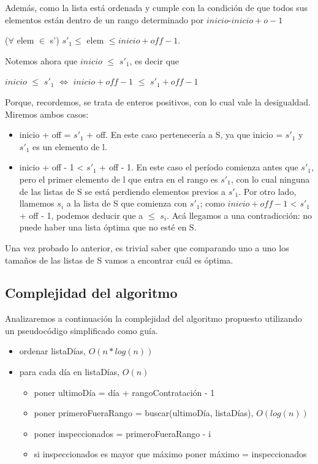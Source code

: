 Adem\'as, como la lista est\'a ordenada y cumple con la condici\'on de que todos sus elementos est\'an dentro de un rango determinado por $inicio$-$inicio + o - 1$\\
\begin{center}
($\forall$ elem $\in$ s') $s'_1 \leq$ elem $\leq inicio + off - 1$.\\
\end{center}

Notemos ahora que $inicio$ $\leq$ $s'_1$, es decir que \\ 
\begin{center}
$inicio$ $\leq$ $s'_1$ $\Leftrightarrow$ $inicio + off - 1$ $\leq$ $s'_1 + off - 1$
\end{center}
Porque, recordemos, se trata de enteros positivos, con lo cual vale la desigualdad.\\

Miremos ambos casos:
\begin{itemize}
\item inicio + off = $s'_1$ + off. En este caso pertenecer\'ia a S, ya que inicio = $s'_1$ y $s'_1$ es un elemento de l.
\item inicio + off - 1 < $s'_1$ + off - 1. En este caso el per\'iodo comienza antes que $s'_1$, pero el primer elemento de l que entra en el rango es $s'_1$, con lo cual ninguna de las listas de S se est\'a perdiendo elementos previos a $s'_1$. Por otro lado, llamemos $s_i$ a la lista de S que comienza con $s'_1$; como $inicio + off - 1$ < $s'_1$ + off - 1, podemos deducir que a $\leq$ $ s_i$. Ac\'a llegamos a una contradicci\'on: no puede haber una lista \'optima que no est\'e en S.
\end{itemize}

Una vez probado lo anterior, es trivial saber que comparando uno a uno los tama\~nos de las listas de S vamos a encontrar cu\'al es \'optima.\\

\subsection{Complejidad del algoritmo}

Analizaremos a continuaci\'on la complejidad del algoritmo propuesto utilizando un pseudoc\'odigo simplificado como gu\'ia.

\begin{itemize}
\item ordenar listaD\'ias, $O(n*log(n))$
\item para cada d\'ia en listaD\'ias, $O(n)$
\begin{itemize}
	\item poner ultimoD\'ia = d\'ia + rangoContrataci\'on - 1
	\item poner primeroFueraRango = buscar(ultimoD\'ia, listaD\'ias), $O(log(n))$
	\item poner inspeccionados = primeroFueraRango - i
	\item si inspeccionados es mayor que m\'aximo poner m\'aximo = inspeccionados
\end{itemize}
\end{itemize}

